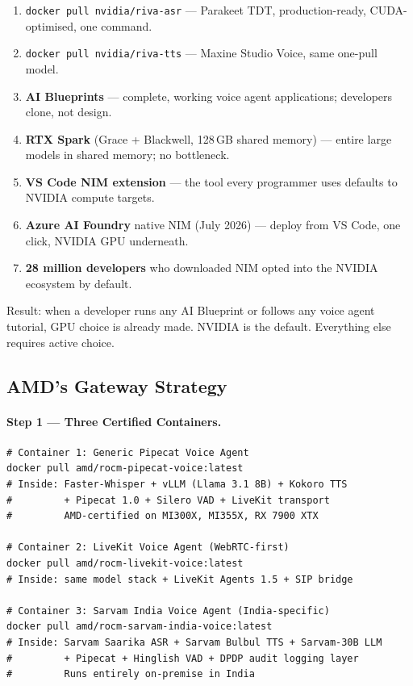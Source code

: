 \documentclass[12pt,a4paper]{article}
\begin{document}
\begin{enumerate}[noitemsep]
  \item \texttt{docker pull nvidia/riva-asr} --- Parakeet TDT, production-ready, CUDA-optimised, one command.
  \item \texttt{docker pull nvidia/riva-tts} --- Maxine Studio Voice, same one-pull model.
  \item \textbf{AI Blueprints} --- complete, working voice agent applications; developers clone, not design.
  \item \textbf{RTX Spark} (Grace + Blackwell, 128\,GB shared memory) --- entire large models in shared memory; no bottleneck.
  \item \textbf{VS Code NIM extension} --- the tool every programmer uses defaults to NVIDIA compute targets.
  \item \textbf{Azure AI Foundry} native NIM (July 2026) --- deploy from VS Code, one click, NVIDIA GPU underneath.
  \item \textbf{28 million developers} who downloaded NIM opted into the NVIDIA ecosystem by default.
\end{enumerate}

Result: when a developer runs any AI Blueprint or follows any voice agent
tutorial, GPU choice is already made.  NVIDIA is the default.  Everything
else requires active choice.

\subsection{AMD's Gateway Strategy}

\paragraph{Step 1 --- Three Certified Containers.}

\begin{lstlisting}[style=bash,caption={The Three AMD Voice AI Containers (Target State)},label=lst:containers]
# Container 1: Generic Pipecat Voice Agent
docker pull amd/rocm-pipecat-voice:latest
# Inside: Faster-Whisper + vLLM (Llama 3.1 8B) + Kokoro TTS
#         + Pipecat 1.0 + Silero VAD + LiveKit transport
#         AMD-certified on MI300X, MI355X, RX 7900 XTX

# Container 2: LiveKit Voice Agent (WebRTC-first)
docker pull amd/rocm-livekit-voice:latest
# Inside: same model stack + LiveKit Agents 1.5 + SIP bridge

# Container 3: Sarvam India Voice Agent (India-specific)
docker pull amd/rocm-sarvam-india-voice:latest
# Inside: Sarvam Saarika ASR + Sarvam Bulbul TTS + Sarvam-30B LLM
#         + Pipecat + Hinglish VAD + DPDP audit logging layer
#         Runs entirely on-premise in India
\end{lstlisting}
\end{document}
